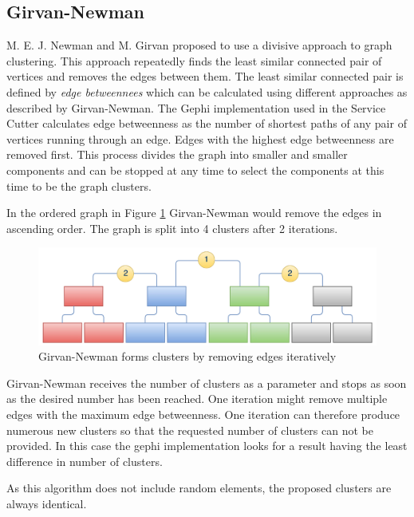 \subsection{Girvan-Newman}
\label{subsec:girvanNewman}
	

M. E. J. Newman and M. Girvan\cite{girvan} proposed to use a divisive approach to graph clustering. This approach repeatedly finds the least similar connected pair of vertices and removes the edges between them. The least similar connected pair is defined by \textit{edge betweennees} which can be calculated using different approaches as described by Girvan-Newman. The Gephi implementation used in the Service Cutter calculates edge betweenness as the number of shortest paths of any pair of vertices running through an edge. Edges with the highest edge betweenness are removed first. This process divides the graph into smaller and smaller components and can be stopped at any time to select the components at this time to be the graph clusters.

In the ordered graph in Figure \ref{fig:girvan-newman-process} Girvan-Newman would remove the edges in ascending order. The graph is split into 4 clusters after 2 iterations.

\begin{figure}[H]
	\begin{center}
		\includegraphics[scale=0.45]{diagrams/Girvan-Newman-Process.pdf}
	\end{center}
	\caption{Girvan-Newman forms clusters by removing edges iteratively}
	\label{fig:girvan-newman-process}
\end{figure}

Girvan-Newman receives the number of clusters as a parameter and stops as soon as the desired number has been reached. One iteration might remove multiple edges with the maximum edge betweenness. One iteration can therefore produce numerous new clusters so that the requested number of clusters can not be provided. In this case the gephi implementation looks for a result having the least difference in number of clusters. 

As this algorithm does not include random elements, the proposed clusters are always identical.

